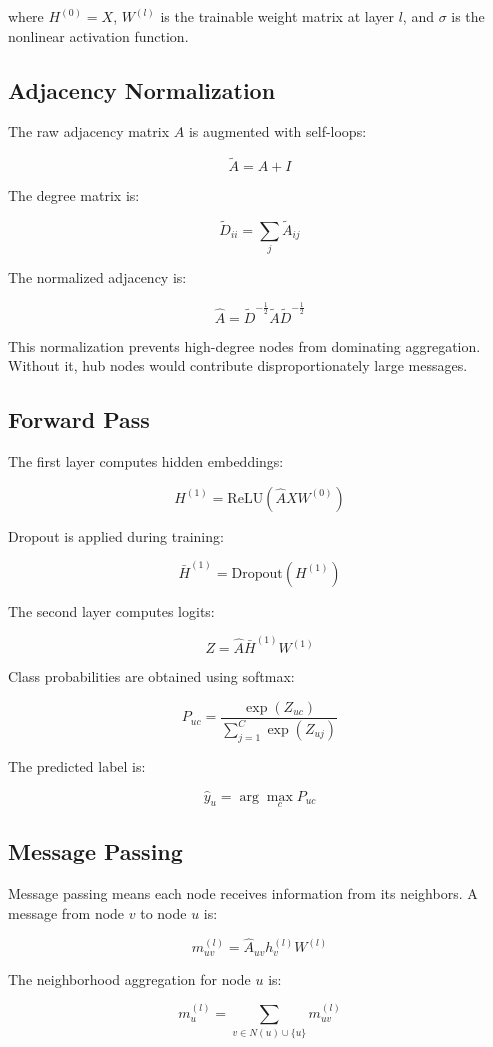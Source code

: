 \documentclass[12pt,a4paper]{article}
\begin{document}
where $H^{(0)}=X$, $W^{(l)}$ is the trainable weight matrix at layer $l$, and $\sigma$ is the nonlinear activation function.

\subsection{Adjacency Normalization}
The raw adjacency matrix $A$ is augmented with self-loops:

$$
\tilde{A}=A+I
$$

The degree matrix is:

$$
\tilde{D}_{ii}=\sum_j \tilde{A}_{ij}
$$

The normalized adjacency is:

$$
\hat{A}=\tilde{D}^{-\frac{1}{2}}\tilde{A}\tilde{D}^{-\frac{1}{2}}
$$

This normalization prevents high-degree nodes from dominating aggregation. Without it, hub nodes would contribute disproportionately large messages.

\subsection{Forward Pass}
The first layer computes hidden embeddings:

$$
H^{(1)}=\text{ReLU}(\hat{A}XW^{(0)})
$$

Dropout is applied during training:

$$
\bar{H}^{(1)}=\text{Dropout}(H^{(1)})
$$

The second layer computes logits:

$$
Z=\hat{A}\bar{H}^{(1)}W^{(1)}
$$

Class probabilities are obtained using softmax:

$$
P_{uc}=\frac{\exp(Z_{uc})}{\sum_{j=1}^{C}\exp(Z_{uj})}
$$

The predicted label is:

$$
\hat{y}_u=\arg\max_c P_{uc}
$$

\subsection{Message Passing}
Message passing means each node receives information from its neighbors. A message from node $v$ to node $u$ is:

$$
m_{uv}^{(l)}=\hat{A}_{uv}h_v^{(l)}W^{(l)}
$$

The neighborhood aggregation for node $u$ is:

$$
m_u^{(l)}=\sum_{v\in N(u)\cup\{u\}}m_{uv}^{(l)}
$$
\end{document}
